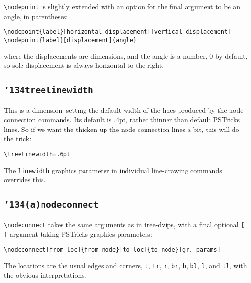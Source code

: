 \documentclass[12pt]{article}
\def\pstricks{PSTricks}
\def\bck{\char'134}
\begin{document}
\verb&\nodepoint& is slightly extended with an option for the final argument
to be an angle, in parentheses:
\begin{example}
\begin{verbatim}
\nodepoint{label}[horizontal displacement][vertical displacement]
\nodepoint{label}[displacement](angle}
\end{verbatim}
\end{example}
where the displacements are dimensions, and the angle is a number, 0 by
default, so sole displacement is always horizontal to the right.

\subsection{\tt \bck treelinewidth}
This is a dimension, setting the default width of the lines produced
by the node connection commands.  Its default is .4pt, rather thinner
than default {\pstricks} lines.  So if we want the thicken up the
node connection lines a bit, this will do the trick:
\begin{example}
\begin{verbatim}
\treelinewidth=.6pt
\end{verbatim}
\end{example}
The {\tt linewidth} graphics parameter in individual line-drawing commands
overrides this.

\subsection{\tt \bck(a)nodeconnect}
\verb&\nodeconnect& takes the same arguments as in {\sf tree-dvips}, with a final optional
\verb&[ ]& argument taking {\pstricks} graphics parameters:
\begin{example}
\begin{verbatim}
\nodeconnect[from loc]{from node}[to loc]{to node}[gr. params]
\end{verbatim}
\end{example}
The locations are the usual edges and corners,
\verb&t&, \verb&tr&, \verb&r&, \verb&br&, \verb&b&, \verb&bl&,
\verb&l&, and \verb&tl&, with the obvious interpretations. 
\end{document}
